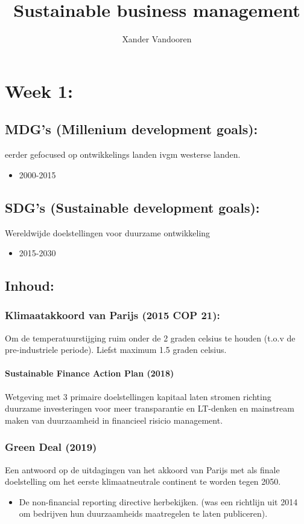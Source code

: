 \documentclass[12pt]{article}
\begin{document}
\begin{titlepage}
    \author{Xander Vandooren}
    \title{Sustainable business management}
\end{titlepage}
\maketitle
\newpage
\tableofcontents
\newpage
{}
\section{Week 1:}
\subsection{MDG's (Millenium development goals):}
eerder gefocused op ontwikkelings landen ivgm westerse landen.
\begin{itemize}
    \item 2000-2015
\end{itemize}
\subsection{SDG's (Sustainable development goals):}
Wereldwijde doelstellingen voor duurzame ontwikkeling
\begin{itemize}
    \item 2015-2030
\end{itemize}
\subsection{Inhoud:}
\subsubsection{Klimaatakkoord van Parijs (2015 COP 21):}
Om de temperatuurstijging ruim onder de 2 graden celsius te houden (t.o.v de pre-industriele periode). Liefst maximum 1.5 graden celsius.
\paragraph{Sustainable Finance Action Plan (2018)}
Wetgeving met 3 primaire doelstellingen kapitaal laten stromen richting duurzame investeringen voor meer transparantie en LT-denken en mainstream maken van duurzaamheid in financieel risicio management.
\subsubsection{Green Deal (2019)}
Een antwoord op de uitdagingen van het akkoord van Parijs met als finale doelstelling om het eerste klimaatneutrale continent te worden tegen 2050.
\begin{itemize}
    \item De non-financial reporting directive herbekijken. (was een richtlijn uit 2014 om bedrijven hun duurzaamheids maatregelen te laten publiceren).
\end{itemize}
\end{document}
